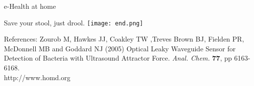 \documentclass[xcolor=dvipsnames]{beamer}
\begin{document}
    \begin{frame}
    \begin{center}
    e\mbox{-}Health at home
    \vspace{2cm}
    
    Save your stool, just drool.\newline
    \texttt{[image: end.png]}
    \end{center}
    \end{frame}
    
    \begin{frame}
    References:
    \vspace{\baselineskip}
    \newline
    Zourob M, Hawkes JJ, Coakley TW ,Treves Brown BJ, Fielden PR, McDonnell MB and Goddard NJ (2005) Optical Leaky Waveguide Sensor for Detection of Bacteria with Ultrasound Attractor Force. \textit{Anal. Chem.} \textbf{77}, pp 6163\mbox{-}6168.\\
    \vspace{1cm}
    http://www.homd.org
    
    \end{frame}
\end{document}
